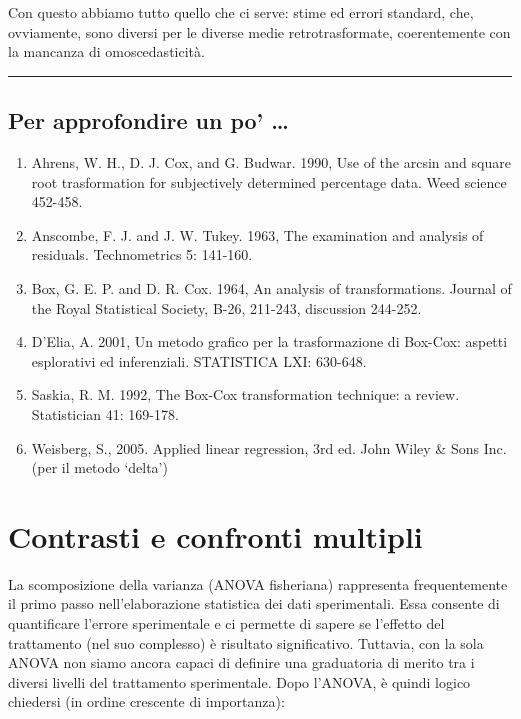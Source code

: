 \documentclass[a4paper,12pt,oneside]{book}
\providecommand{\tightlist}{%
  \setlength{\itemsep}{0pt}\setlength{\parskip}{0pt}}
\begin{document}
Con questo abbiamo tutto quello che ci serve: stime ed errori standard, che, ovviamente, sono diversi per le diverse medie retrotrasformate, coerentemente con la mancanza di omoscedasticità.

\begin{center}\rule{0.5\linewidth}{\linethickness}\end{center}

\hypertarget{per-approfondire-un-po-6}{%
\section{Per approfondire un po' \ldots{}}\label{per-approfondire-un-po-6}}

\begin{enumerate}
\def\labelenumi{\arabic{enumi}.}
\tightlist
\item
  Ahrens, W. H., D. J. Cox, and G. Budwar. 1990, Use of the arcsin and square root trasformation for subjectively determined percentage data. Weed science 452-458.
\item
  Anscombe, F. J. and J. W. Tukey. 1963, The examination and analysis of residuals. Technometrics 5: 141-160.
\item
  Box, G. E. P. and D. R. Cox. 1964, An analysis of transformations. Journal of the Royal Statistical Society, B-26, 211-243, discussion 244-252.
\item
  D'Elia, A. 2001, Un metodo grafico per la trasformazione di Box-Cox: aspetti esplorativi ed inferenziali. STATISTICA LXI: 630-648.
\item
  Saskia, R. M. 1992, The Box-Cox transformation technique: a review. Statistician 41: 169-178.
\item
  Weisberg, S., 2005. Applied linear regression, 3rd ed. John Wiley \& Sons Inc. (per il metodo `delta')
\end{enumerate}

\hypertarget{contrasti-e-confronti-multipli}{%
\chapter{Contrasti e confronti multipli}\label{contrasti-e-confronti-multipli}}

La scomposizione della varianza (ANOVA fisheriana) rappresenta frequentemente il primo passo nell'elaborazione statistica dei dati sperimentali. Essa consente di quantificare l'errore sperimentale e ci permette di sapere se l'effetto del trattamento (nel suo complesso) è risultato significativo. Tuttavia, con la sola ANOVA non siamo ancora capaci di definire una graduatoria di merito tra i diversi livelli del trattamento sperimentale. Dopo l'ANOVA, è quindi logico chiedersi (in ordine crescente di importanza):
\end{document}
